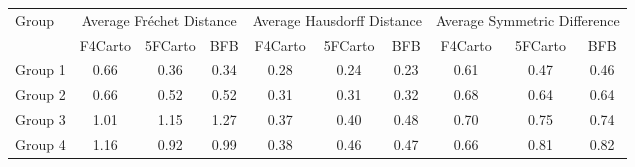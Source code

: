 
\begin{tabular}{lccc|ccc|ccc}
\toprule
\multirow{2}{*}{Group} & \multicolumn{3}{c}{Average Fréchet Distance} & \multicolumn{3}{c}{Average Hausdorff Distance} & \multicolumn{3}{c}{Average Symmetric Difference} \\
\cmidrule(lr){2-10}
                   & F4Carto & 5FCarto & BFB & F4Carto & 5FCarto & BFB & F4Carto & 5FCarto & BFB \\
\midrule

Group 1 & 0.66 & 0.36 & 0.34 & 0.28 & 0.24 & 0.23 & 0.61 & 0.47 & 0.46 \\
Group 2 & 0.66 & 0.52 & 0.52 & 0.31 & 0.31 & 0.32 & 0.68 & 0.64 & 0.64 \\
Group 3 & 1.01 & 1.15 & 1.27 & 0.37 & 0.40 & 0.48 & 0.70 & 0.75 & 0.74 \\
Group 4 & 1.16 & 0.92 & 0.99 & 0.38 & 0.46 & 0.47 & 0.66 & 0.81 & 0.82 \\
\bottomrule
\end{tabular}
